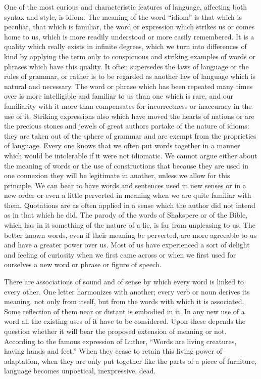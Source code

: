 \documentclass[11pt,letter]{article}
\begin{document}
\par  One of the most curious and characteristic features of language, affecting both syntax and style, is idiom. The meaning of the word “idiom” is that which is peculiar, that which is familiar, the word or expression which strikes us or comes home to us, which is more readily understood or more easily remembered. It is a quality which really exists in infinite degrees, which we turn into differences of kind by applying the term only to conspicuous and striking examples of words or phrases which have this quality. It often supersedes the laws of language or the rules of grammar, or rather is to be regarded as another law of language which is natural and necessary. The word or phrase which has been repeated many times over is more intelligible and familiar to us than one which is rare, and our familiarity with it more than compensates for incorrectness or inaccuracy in the use of it. Striking expressions also which have moved the hearts of nations or are the precious stones and jewels of great authors partake of the nature of idioms: they are taken out of the sphere of grammar and are exempt from the proprieties of language. Every one knows that we often put words together in a manner which would be intolerable if it were not idiomatic. We cannot argue either about the meaning of words or the use of constructions that because they are used in one connexion they will be legitimate in another, unless we allow for this principle. We can bear to have words and sentences used in new senses or in a new order or even a little perverted in meaning when we are quite familiar with them. Quotations are as often applied in a sense which the author did not intend as in that which he did. The parody of the words of Shakspere or of the Bible, which has in it something of the nature of a lie, is far from unpleasing to us. The better known words, even if their meaning be perverted, are more agreeable to us and have a greater power over us. Most of us have experienced a sort of delight and feeling of curiosity when we first came across or when we first used for ourselves a new word or phrase or figure of speech.

\par  There are associations of sound and of sense by which every word is linked to every other. One letter harmonizes with another; every verb or noun derives its meaning, not only from itself, but from the words with which it is associated. Some reflection of them near or distant is embodied in it. In any new use of a word all the existing uses of it have to be considered. Upon these depends the question whether it will bear the proposed extension of meaning or not. According to the famous expression of Luther, “Words are living creatures, having hands and feet.” When they cease to retain this living power of adaptation, when they are only put together like the parts of a piece of furniture, language becomes unpoetical, inexpressive, dead.
\end{document}
